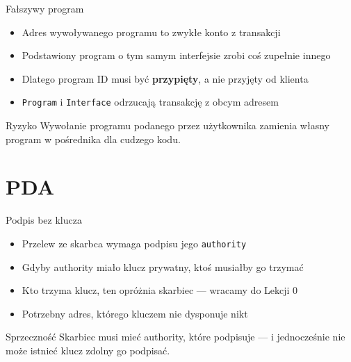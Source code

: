 \begin{frame}{Fałszywy program}
  \begin{itemize}
    \item Adres wywoływanego programu to zwykłe konto z transakcji
    \item Podstawiony program o tym samym interfejsie zrobi coś zupełnie innego
    \item Dlatego program ID musi być \textbf{przypięty}, a nie przyjęty od klienta
    \item \texttt{Program} i \texttt{Interface} odrzucają transakcję z obcym adresem
  \end{itemize}
  \vspace{0.15cm}
  \begin{alertblock}{Ryzyko}
    Wywołanie programu podanego przez użytkownika zamienia własny program
    w pośrednika dla cudzego kodu.
  \end{alertblock}
\end{frame}

\section{PDA}

\begin{frame}{Podpis bez klucza}
  \begin{itemize}
    \item Przelew ze skarbca wymaga podpisu jego \texttt{authority}
    \item Gdyby authority miało klucz prywatny, ktoś musiałby go trzymać
    \item Kto trzyma klucz, ten opróżnia skarbiec --- wracamy do Lekcji 0
    \item Potrzebny adres, którego kluczem nie dysponuje nikt
  \end{itemize}
  \vspace{0.25cm}
  \begin{alertblock}{Sprzeczność}
    Skarbiec musi mieć authority, które podpisuje --- i jednocześnie nie może
    istnieć klucz zdolny go podpisać.
  \end{alertblock}
\end{frame}

